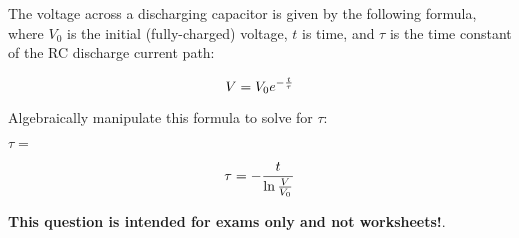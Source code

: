 

The voltage across a discharging capacitor is given by the following formula, where $V_0$ is the initial (fully-charged) voltage, $t$ is time, and $\tau$ is the time constant of the RC discharge current path:
 
$$V = V_0 e^{- {t \over \tau}}$$

Algebraically manipulate this formula to solve for $\tau$:

\vskip 20pt

$\tau = $







$$\tau = -{t \over \ln {V \over V_0}}$$







{\bf This question is intended for exams only and not worksheets!}.



